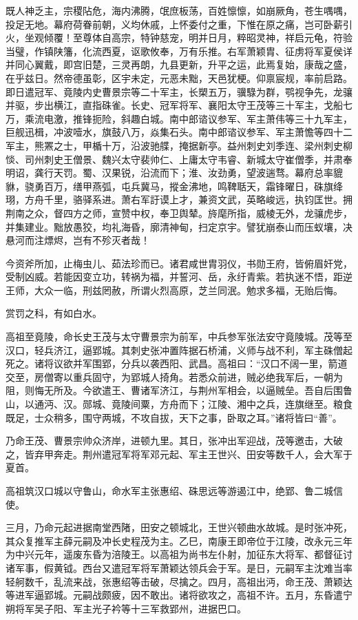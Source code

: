 \documentclass[12pt,UTF8]{ctexbook}
\begin{document}
既人神乏主，宗稷阽危，海内沸腾，氓庶板荡，百姓懔懔，如崩厥角，苍生喁喁，投足无地。幕府荷眷前朝，义均休戚，上怀委付之重，下惟在原之痛，岂可卧薪引火，坐观倾覆！至尊体自高宗，特钟慈宠，明并日月，粹昭灵神，祥启元龟，符验当璧，作镇陕籓，化流西夏，讴歌攸奉，万有乐推。右军萧颖胄、征虏将军夏侯详并同心翼戴，即宫旧楚，三灵再朗，九县更新，升平之运，此焉复始，康哉之盛，在乎兹日。然帝德虽彰，区宇未定，元恶未黜，天邑犹梗。仰禀宸规，率前启路。即日遣冠军、竟陵内史曹景宗等二十军主，长槊五万，骥騄为群，鹗视争先，龙骧并驱，步出横江，直指硃雀。长史、冠军将军、襄阳太守王茂等三十军主，戈船七万，乘流电激，推锋扼险，斜趣白城。南中郎谘议参军、军主萧伟等三十九军主，巨舰迅楫，冲波噎水，旗鼓八万，焱集石头。南中郎谘议参军、军主萧憺等四十二军主，熊罴之士，甲楯十万，沿波驰艓，掩据新亭。益州刺史刘季连、梁州刺史柳惔、司州刺史王僧景、魏兴太守裴帅仁、上庸太守韦睿、新城太守崔僧季，并肃奉明诏，龚行天罚。蜀、汉果锐，沿流而下；淮、汝劲勇，望波遄骛。幕府总率貔貅，骁勇百万，缮甲燕弧，屯兵冀马，摐金沸地，鸣鞞聒天，霜锋曜日，硃旗绛珝，方舟千里，骆驿系进。萧右军訏谟上才，兼资文武，英略峻远，执钧匡世。拥荆南之众，督四方之师，宣赞中权，奉卫舆辇。旍麾所指，威棱无外，龙骧虎步，并集建业。黜放愚狡，均礼海昏，廓清神甸，扫定京宇。譬犹崩泰山而压蚁壤，决悬河而注熛烬，岂有不殄灭者哉！

今资斧所加，止梅虫儿、茹法珍而已。诸君咸世胄羽仪，书勋王府，皆俯眉奸党，受制凶威。若能因变立功，转祸为福，并誓河、岳，永纡青紫。若执迷不悟，距逆王师，大众一临，刑兹罔赦，所谓火烈高原，芝兰同泯。勉求多福，无贻后悔。

赏罚之科，有如白水。

高祖至竟陵，命长史王茂与太守曹景宗为前军，中兵参军张法安守竟陵城。茂等至汉口，轻兵济江，逼郢城。其刺史张冲置阵据石桥浦，义师与战不利，军主硃僧起死之。诸将议欲并军围郢，分兵以袭西阳、武昌。高祖曰：“汉口不阔一里，箭道交至，房僧寄以重兵固守，为郢城人掎角。若悉众前进，贼必绝我军后，一朝为阻，则悔无所及。今欲遣王、曹诸军济江，与荆州军相会，以逼贼垒。吾自后围鲁山，以通沔、汉。郧城、竟陵间粟，方舟而下；江陵、湘中之兵，连旗继至。粮食既足，士众稍多，围守两城，不攻自拔，天下之事，卧取之耳。”诸将皆曰“善”。

乃命王茂、曹景宗帅众济岸，进顿九里。其日，张冲出军迎战，茂等邀击，大破之，皆弃甲奔走。荆州遣冠军将军邓元起、军主王世兴、田安等数千人，会大军于夏首。

高祖筑汉口城以守鲁山，命水军主张惠绍、硃思远等游遏江中，绝郢、鲁二城信使。

三月，乃命元起进据南堂西陼，田安之顿城北，王世兴顿曲水故城。是时张冲死，其众复推军主薛元嗣及冲长史程茂为主。乙巳，南康王即帝位于江陵，改永元三年为中兴元年，遥废东昏为涪陵王。以高祖为尚书左仆射，加征东大将军、都督征讨诸军事，假黄钺。西台又遣冠军将军萧颖达领兵会于军。是日，元嗣军主沈难当率轻舸数千，乱流来战，张惠绍等击破，尽擒之。四月，高祖出沔，命王茂、萧颖达等进军逼郢城。元嗣战颇疲，因不敢出。诸将欲攻之，高祖不许。五月，东昏遣宁朔将军吴子阳、军主光子衿等十三军救郢州，进据巴口。
\end{document}
